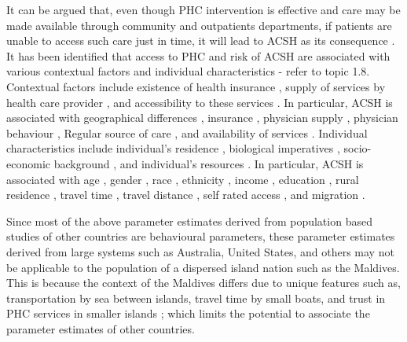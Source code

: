 It can be argued that, even though PHC intervention is effective and care may be made available through community and outpatients departments, if patients are unable to access such care just in time, it will lead to ACSH as its consequence \cite{ansari2012patient,ansari2006access,laditka2003hospital,bindman1995preventable,billings1993impact,millman1993access}. It has been identified that access to PHC and risk of ACSH are associated with various contextual factors and individual characteristics - refer to topic 1.8. Contextual factors include existence of health insurance \cite{friedman2001health,kozak2001trends}, supply of services by health care provider \cite{laditka2004physician,basu2002primary,laditka2005more,parchman1994primary, Parchman1999preventable,Falik2001ambulatory, Gill1998the}, and accessibility to these services \cite{mobley2006spatial,probst2007effects}. In particular, ACSH is associated with geographical differences \cite{mobley2006spatial}, insurance \cite{friedman2001health,kozak2001trends}, physician supply \cite{laditka2004physician,basu2002primary,laditka2005more,parchman1994primary}, physician behaviour \cite{laditka2004physician}, Regular source of care \cite{Falik2001ambulatory}, and availability of services \cite{Parchman1999preventable}. Individual characteristics include individual's residence \cite{Falik2001ambulatory,ricketts2001hospitalization}, biological imperatives \cite{Falik2001ambulatory,ricketts2001hospitalization,laditka2003hospital}, socio-economic background \cite{ansari2006access}, and individual's resources \cite{ansari2006access,billings1996recent}. In particular, ACSH is associated with age \cite{Falik2001ambulatory, ricketts2001hospitalization}, gender \cite{laditka2003hospital}, race \cite{laditka2003hospital}, ethnicity \cite{laditka2003hospital}, income \cite{ansari2006access,billings1996recent}, education \cite{ansari2006access}, rural residence \cite{Falik2001ambulatory, ricketts2001hospitalization}, travel time \cite{probst2007effects}, travel distance \cite{probst2007effects}, self rated access \cite{ansari2006access}, and migration \cite{correa2007six}.  

Since most of the above parameter estimates derived from population based studies of other countries are behavioural parameters, these parameter estimates derived from large systems such as Australia, United States, and others may not be applicable to the population of a dispersed island nation such as the Maldives. This is because the context of the Maldives differs due to unique features such as, transportation by sea between islands, travel time by small boats, \cite{MOH:health:plan} and trust in PHC services in smaller islands \cite{health:profile:2010}; which limits the potential to associate the parameter estimates of other countries.

